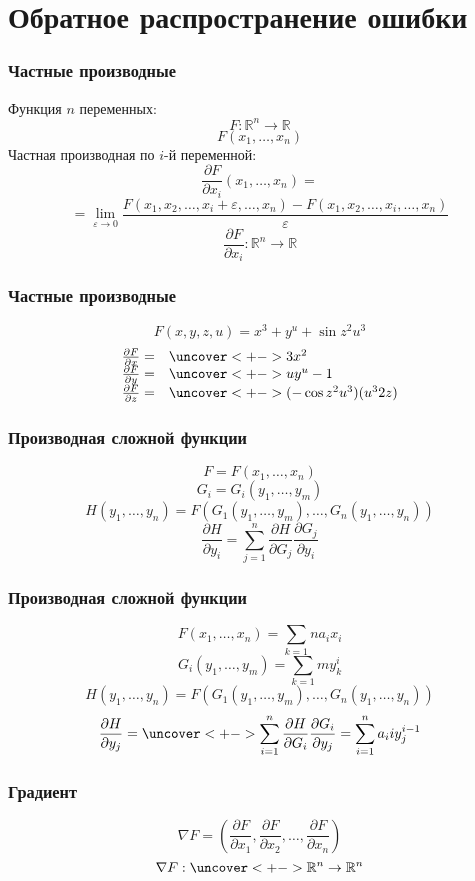 \documentclass[24pt,pdf,hyperref={unicode}]{beamer}
\newcommand{\dd}[2]{\frac{\partial #1}{\partial #2}}
\begin{document}
\section{Обратное распространение ошибки}


\begin{frame}\frametitle{Частные производные}
Функция $n$ переменных:
$$
F:\mathbb{R}^n\rightarrow\mathbb{R} 
$$
$$
F(x_1,\ldots,x_n)
$$
Частная производная по $i$-й переменной:
$$
\dd{F}{x_i}(x_1,\ldots,x_n)=
$$
$$
=\lim_{\varepsilon\rightarrow 0}\frac{F(x_1,x_2,\ldots,x_i+\varepsilon,\ldots,x_n)-F(x_1,x_2,\ldots,x_i,\ldots,x_n)}{\varepsilon}
$$
$$
\dd{F}{x_i}:\mathbb{R}^n\rightarrow\mathbb{R}
$$

\end{frame}

\begin{frame}\frametitle{Частные производные}
\uncover<+->{}
$$
F(x,y,z,u)=x^3+y^u+\sin z^2u^3
$$
$$
\begin{array}{l l}
\dd{F}{x} = & \uncover<+->{3x^2} \\
\dd{F}{y}= & \uncover<+->{uy^u-1} \\
\dd{F}{z}= & \uncover<+->{(-\cos z^2u^3)(u^32z)}
\end{array}
$$
\end{frame}

\begin{frame}\frametitle{Производная сложной функции}
$$
F=F(x_1,\ldots,x_n)
$$
$$
G_i=G_i(y_1,\ldots,y_m)
$$
$$
H(y_1,\ldots,y_n)=F(G_1(y_1,\ldots,y_m),\ldots, G_n(y_1,\ldots,y_n))
$$
$$
\dd{H}{y_i}=\sum_{j=1}^{n}\dd{H}{G_j}\dd{G_j}{y_i}
$$
\end{frame}

\begin{frame}\frametitle{Производная сложной функции}
\uncover<+->{}
$$
F(x_1,\ldots,x_n)=\sum_{k=1}{n} a_ix_i
$$
$$
G_i(y_1,\ldots,y_m)=\sum_{k=1}{m}y_k^i
$$
$$
H(y_1,\ldots,y_n)=F(G_1(y_1,\ldots,y_m),\ldots, G_n(y_1,\ldots,y_n))
$$
\uncover<+->{
$$
\dd{F}{G_i}=a_i,\ \dd{G_i}{y_j}=iy_j^{i-1}
$$
}
$$
\dd{H}{y_j}=\uncover<+->{\sum_{i=1}^{n}\dd{H}{G_i}\dd{G_i}{y_j}=\sum_{i=1}^{n} a_iiy_j^{i-1}}
$$

\end{frame}

\begin{frame}\frametitle{Градиент}
\uncover<+->{}
$$
\nabla F = \left(\dd{F}{x_1},\dd{F}{x_2},\ldots,\dd{F}{x_n}\right)
$$
$$
\nabla F : \uncover<+->{\mathbb{R}^n\rightarrow\mathbb{R}^n}
$$
\end{frame}
\end{document}
